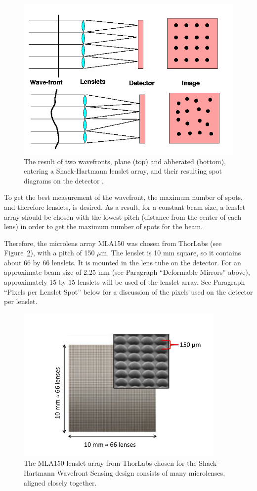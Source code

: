 \documentclass[12pt]{article}
\begin{document}
\begin{figure}[ht]
\centering
  \includegraphics[width=5in]{images/payload_SH.png}
\caption{The result of two wavefronts, plane (top)
  and abberated (bottom), entering a Shack-Hartmann lenslet array, and their
  resulting spot diagrams on the detector \cite{ctio_AO}.}
\label{fig:lenslet_array}
\end{figure}

To get the best measurement of the wavefront, the maximum number of spots, and therefore lenslets, is desired. As a result, for a constant beam size, a lenslet array should be chosen with the lowest pitch (distance from the center of each lens) in order to get the maximum number of spots for the beam. 

Therefore, the microlens array MLA150 was chosen from ThorLabs \cite{MLA150} (see Figure~\ref{fig:MLA150}), with a pitch of 150 $\mu$m.
The lenslet is 10 mm square, so it contains about 66 by 66 lenslets. It is mounted in the lens tube on the detector. For an approximate beam size of 2.25 mm (see Paragraph ``Deformable Mirrors'' above), approximately 15 by 15 lenslets will be used of the lenslet array.  See Paragraph ``Pixels per Lenslet Spot'' below for a discussion of the pixels used on the detector per lenslet.

\begin{figure}[ht]
\centering
  \includegraphics[width=4in]{images/payload_MLA.jpg}
\caption{The MLA150 lenslet array from ThorLabs \cite{MLA150} chosen for the Shack-Hartmann Wavefront Sensing design consists of many microlenses, aligned closely together.}
\label{fig:MLA150}
\end{figure}
\end{document}
